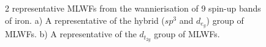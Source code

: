 	\begin{figure}[h!]
	\centering
	\hspace{3cm}
	\centering
	\caption{2 representative MLWFs from the wannierisation of 9 spin-up bands of iron. a) A representative of the hybrid ($sp^3$ and $d_{e_g}$) group of MLWFs. b) A representative of the $d_{t_{2g}}$ group of MLWFs.}\label{fig8.3}
	\end{figure}

